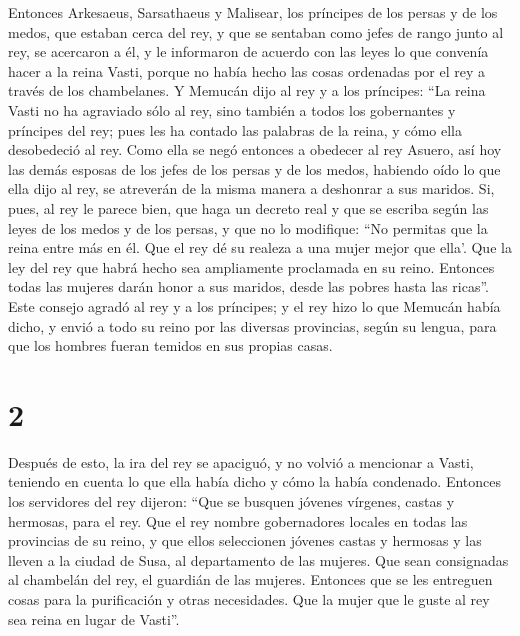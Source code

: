  Entonces Arkesaeus, Sarsathaeus y Malisear, los
príncipes de los persas y de los medos, que estaban cerca del rey, y que
se sentaban como jefes de rango junto al rey, se acercaron a él,
 y le informaron de acuerdo con las leyes lo que convenía
hacer a la reina Vasti, porque no había hecho las cosas ordenadas por el
rey a través de los chambelanes.  Y Memucán dijo al rey y
a los príncipes: ``La reina Vasti no ha agraviado sólo al rey, sino
también a todos los gobernantes y príncipes del rey; 
pues les ha contado las palabras de la reina, y cómo ella desobedeció al
rey. Como ella se negó entonces a obedecer al rey Asuero,
 así hoy las demás esposas de los jefes de los persas y
de los medos, habiendo oído lo que ella dijo al rey, se atreverán de la
misma manera a deshonrar a sus maridos.  Si, pues, al rey
le parece bien, que haga un decreto real y que se escriba según las
leyes de los medos y de los persas, y que no lo modifique: ``No permitas
que la reina entre más en él. Que el rey dé su realeza a una mujer mejor
que ella'.  Que la ley del rey que habrá hecho sea
ampliamente proclamada en su reino. Entonces todas las mujeres darán
honor a sus maridos, desde las pobres hasta las ricas''. 
Este consejo agradó al rey y a los príncipes; y el rey hizo lo que
Memucán había dicho,  y envió a todo su reino por las
diversas provincias, según su lengua, para que los hombres fueran
temidos en sus propias casas.

\hypertarget{section-1}{%
\section{2}\label{section-1}}

 Después de esto, la ira del rey se apaciguó, y no volvió
a mencionar a Vasti, teniendo en cuenta lo que ella había dicho y cómo
la había condenado.  Entonces los servidores del rey
dijeron: ``Que se busquen jóvenes vírgenes, castas y hermosas, para el
rey.  Que el rey nombre gobernadores locales en todas las
provincias de su reino, y que ellos seleccionen jóvenes castas y
hermosas y las lleven a la ciudad de Susa, al departamento de las
mujeres. Que sean consignadas al chambelán del rey, el guardián de las
mujeres. Entonces que se les entreguen cosas para la purificación y
otras necesidades.  Que la mujer que le guste al rey sea
reina en lugar de Vasti''.


